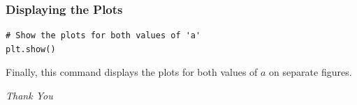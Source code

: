 \documentclass{beamer}
\begin{document}
\begin{frame}[fragile]
    \frametitle{Displaying the Plots}

    \begin{lstlisting}
# Show the plots for both values of 'a'
plt.show()
    \end{lstlisting}

    Finally, this command displays the plots for both values of \( a \) on separate figures.
\end{frame}
\begin{frame}{}
  \centering \Huge
  \emph{Thank You}
\end{frame}
\end{document}
